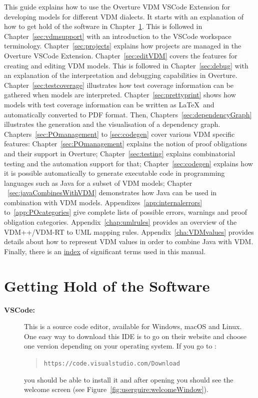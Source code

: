 \documentclass{overturerepchap}
\newcommand{\url}[1]{\texttt{#1}}
\begin{document}
This guide explains how to use the Overture VDM VSCode Extension for developing models
for different VDM dialects. It starts with an explanation
of how to get hold of the software in
Chapter~\ref{sec:install}. This is followed in
Chapter~\ref{sec:vdmsupport} with an introduction to the VSCode
workspace terminology. Chapter~\ref{sec:projects} explains how
projects are managed in the Overture VSCode Extension. Chapter~\ref{sec:editVDM}
covers the features for creating and editing VDM models. This is
followed in Chapter~\ref{sec:debug} with an explanation of the
interpretation and debugging capabilities in Overture.
Chapter~\ref{sec:testcoverage} illustrates how test coverage
information can be gathered when models are interpreted.
Chapter~\ref{sec:prettyprint} shows how models with test
coverage information can be written as
\LaTeX\ and automatically converted to PDF format. Then, Chapters~\ref{sec:dependencyGraph} illustrates the generation and the visualisation of a dependency graph.
Chapters~\ref{sec:POmanagement} to \ref{sec:codegen} cover various
VDM specific features: Chapter~\ref{sec:POmanagement}
explains the notion of proof obligations and their support in
Overture; Chapter~\ref{sec:testing} explains
combinatorial testing and the automation support for that; Chapter~\ref{sec:codegen} explains
how it is possible automatically to generate executable code in programming languages such as Java for a subset of VDM models; Chapter ~\ref{sec:javaCombinesWithVDM}
demonstrates how Java can be used in combination with VDM models.
Appendixes~\ref{app:internalerrors}
to~\ref{app:POcategories} give complete lists of possible errors,
warnings and proof obligation categories. Appendix~\ref{chap:umlrules} provides
an overview of the VDM++/VDM-RT to UML mapping rules. 
Appendix~\ref{cha:VDMvalues} provides details about how to represent VDM 
values in order to combine Java with VDM.
Finally, there is an \hyperref[sec:index]{index} of significant terms used in this
manual.


\chapter{Getting Hold of the Software}\label{sec:install}

\begin{description}
\item[\textbf{VSCode:}] This is a source code editor, available for Windows, macOS and Linux. One easy way to download this IDE is to go on their website and choose one version depending on your operating system. If you go to :
  \begin{quote}
  \url{https://code.visualstudio.com/Download}
  \end{quote}
  \noindent you should be able to install it and after opening you should see the welcome screen (see
Figure~\ref{fig:userguire:welcomeWindow}).
\end{description}
\end{document}
